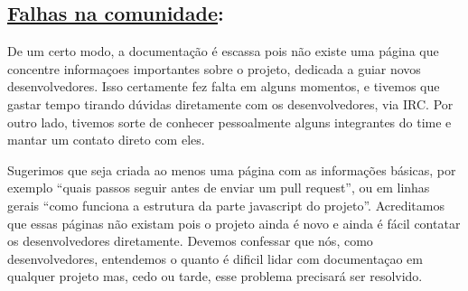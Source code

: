 \subsection*{\underline{Falhas na comunidade}:}

De um certo modo, a documentação é escassa pois não existe uma página que
concentre informaçoes importantes sobre o projeto, dedicada a guiar novos
desenvolvedores. Isso certamente fez falta em alguns momentos, e tivemos que
gastar tempo tirando dúvidas diretamente com os desenvolvedores, via IRC. Por
outro lado, tivemos sorte de conhecer pessoalmente alguns integrantes do time
e mantar um contato direto com eles.

Sugerimos que seja criada ao menos uma página com as informações básicas, por
exemplo ``quais passos seguir antes de enviar um pull request'', ou em linhas
gerais ``como funciona a estrutura da parte javascript do projeto''.
Acreditamos que essas páginas não existam pois o projeto ainda é novo e ainda é
fácil contatar os desenvolvedores diretamente. Devemos confessar que nós, como
desenvolvedores, entendemos o quanto é dificil lidar com documentaçao em
qualquer projeto mas, cedo ou tarde, esse problema precisará ser resolvido.
